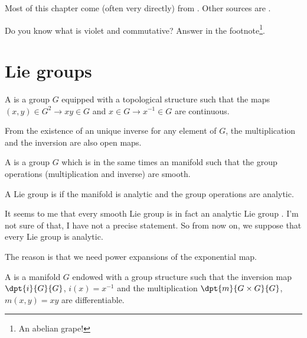 
Most of this chapter come (often very directly) from \cite{Helgason}. Other sources are \cite{Knapp_reprez,DirkEnvFiniteDimNilLieAlg,SamelsonNotesLieAlg,SternLieAlgebra}.

Do you know what is violet and commutative? Answer in the footnote\footnote{An abelian grape!}.

\section{Lie groups}

\begin{definition}
    A  is a group $G$ equipped with a topological structure such that the maps $(x,y)\in G^2\to xy\in G$ and $x\in G\to x^{-1}\in G$ are continuous.
\end{definition}

\begin{remark}\label{rem:ouvert}
From the existence of an unique inverse for any element of $G$, the multiplication and the inversion are also open maps.
\end{remark}

\begin{definition}
    A  is a group $G$ which is in the same times an manifold such that the group operations (multiplication and inverse) are smooth.

    A Lie group is  if the manifold is analytic and the group operations are analytic.
\end{definition}

\begin{probleme}
    It seems to me that every smooth Lie group is in fact an analytic Lie group \cite{BIBooIMFVooPoybEp,BIBooTKQTooGjFxwB}. I'm not sure of that, I have not a precise statement. So from now on, we suppose that every Lie group is analytic.

    The reason is that we need power expansions of the exponential map.
\end{probleme}

\begin{definition}      \label{DEFooGDWTooTvINuw}
    A  is a manifold $G$ endowed with a group structure such that the inversion map $\dpt{i}{G}{G}$, $i(x)=x^{-1}$ and the multiplication $\dpt{m}{G\times G}{G}$, $m(x,y)=xy$ are differentiable. 
\end{definition}

